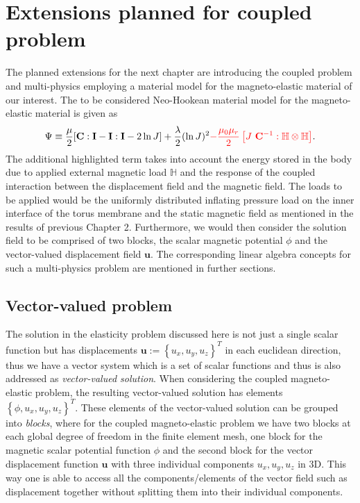 \section{Extensions planned for coupled problem}
The planned extensions for the next chapter are introducing the coupled problem and multi-physics employing a material model for the magneto-elastic material of our interest. The to be considered Neo-Hookean material model for the magneto-elastic material is given as
\begin{equation}
\Psi \equiv \dfrac{\mu}{2} [\mathbf{C} : \mathbf{I} - \mathbf{I} : \mathbf{I} - 2 \ln J] + \dfrac{\lambda}{2} (\ln J)^2 \textcolor{red}{- \dfrac{\mu_0 \mu_r}{2} \left[ J \ \mathbf{C}^{-1} : \mathbb{H} \otimes \mathbb{H} \right]}.
\end{equation}
The additional highlighted term takes into account the energy stored in the body due to applied external magnetic load $\mathbb{H}$ and the response of the coupled interaction between the displacement field and the magnetic field. The loads to be applied would be the uniformly distributed inflating pressure load on the inner interface of the torus membrane and the static magnetic field as mentioned in the results of previous Chapter 2. Furthermore, we would then consider the solution field to be comprised of two blocks, the scalar magnetic potential $\phi$ and the vector-valued displacement field $\mathbf{u}$. The corresponding linear algebra concepts for such a multi-physics problem are mentioned in further sections.

\subsection*{Vector-valued problem} 
The solution in the elasticity problem discussed here is not just a single scalar function but has displacements $\mathbf{u} := \left\lbrace u_x, u_y, u_z \right\rbrace^T$ in each euclidean direction, thus we have a vector system which is a set of scalar functions and thus is also addressed as \textit{vector-valued solution}. When considering the coupled magneto-elastic problem, the resulting vector-valued solution has elements $\left\lbrace \phi, u_x, u_y, u_z \right\rbrace^T$. These elements of the vector-valued solution can be grouped into \textit{blocks}, where for the coupled magneto-elastic problem we have two blocks at each global degree of freedom in the finite element mesh, one block for the magnetic scalar potential function $\phi$ and the second block for the vector displacement function $\mathbf{u}$ with three individual components $u_x, u_y, u_z$ in 3D. This way one is able to access all the components/elements of the vector field such as displacement together without splitting them into their individual components. 

